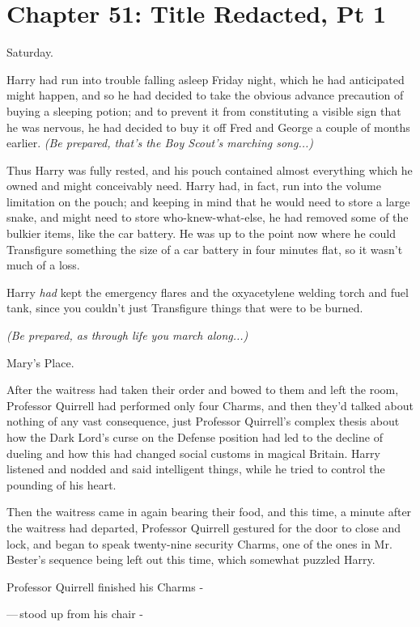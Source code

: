 \chapter{Chapter 51: Title Redacted, Pt 1}
Saturday.

Harry had run into trouble falling asleep Friday night, which he had anticipated might happen, and so he had decided to take the obvious advance precaution of buying a sleeping potion; and to prevent it from constituting a visible sign that he was nervous, he had decided to buy it off Fred and George a couple of months earlier. \emph{(Be prepared, that's the Boy Scout's marching song...)}

Thus Harry was fully rested, and his pouch contained almost everything which he owned and might conceivably need. Harry had, in fact, run into the volume limitation on the pouch; and keeping in mind that he would need to store a large snake, and might need to store who-knew-what-else, he had removed some of the bulkier items, like the car battery. He was up to the point now where he could Transfigure something the size of a car battery in four minutes flat, so it wasn't much of a loss.

Harry \emph{had} kept the emergency flares and the oxyacetylene welding torch and fuel tank, since you couldn't just Transfigure things that were to be burned.

\emph{(Be prepared, as through life you march along...)}

Mary's Place.

After the waitress had taken their order and bowed to them and left the room, Professor Quirrell had performed only four Charms, and then they'd talked about nothing of any vast consequence, just Professor Quirrell's complex thesis about how the Dark Lord's curse on the Defense position had led to the decline of dueling and how this had changed social customs in magical Britain. Harry listened and nodded and said intelligent things, while he tried to control the pounding of his heart.

Then the waitress came in again bearing their food, and this time, a minute after the waitress had departed, Professor Quirrell gestured for the door to close and lock, and began to speak twenty-nine security Charms, one of the ones in Mr. Bester's sequence being left out this time, which somewhat puzzled Harry.

Professor Quirrell finished his Charms -

---\,stood up from his chair -

